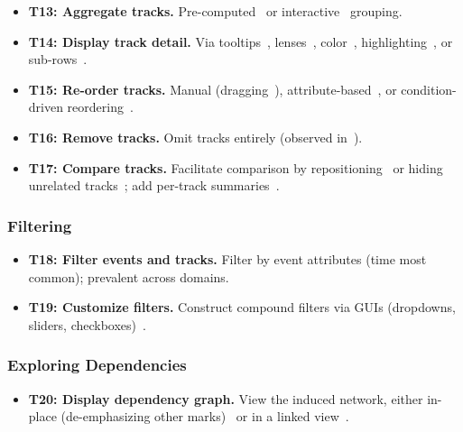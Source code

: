\begin{refsection}
\begin{itemize}\itemsep0.25ex
\item \textbf{T13: Aggregate tracks.} Pre-computed~\cite{sakin2022traveler, sun2021daisen, nesi2023summarizing} or interactive~\cite{plaisant1998information, jo2014livegantt, kaldor2017canopy} grouping.

\item \textbf{T14: Display track detail.} Via tooltips~\cite{sun2021daisen}, lenses~\cite{jo2014livegantt}, color~\cite{schnorr2010triva}, highlighting~\cite{drebes2014aftermath, adhianto2010hpctoolkit}, or sub-rows~\cite{plaisant1998information}. 

\item \textbf{T15: Re-order tracks.} Manual (dragging~\cite{de2000paje}), attribute-based~\cite{heath1991visualizing}, or condition-driven reordering~\cite{jo2014livegantt, de2010zinsight}. 

\item \textbf{T16: Remove tracks.} Omit tracks entirely (observed in~\cite{gupta2016movementslicer}). 

\item \textbf{T17: Compare tracks.} Facilitate comparison by repositioning~\cite{sun2021daisen} or hiding unrelated tracks~\cite{koike1997visualinda,tory2013comparative, kaldor2017canopy}; add per-track summaries~\cite{pinto2016analyzing}.
\end{itemize}

\subsubsection{Filtering}

\begin{itemize}\itemsep0.25ex
\item \textbf{T18: Filter events and tracks.} Filter by event attributes (time most common); prevalent across domains.

\item \textbf{T19: Customize filters.} Construct compound filters via GUIs (dropdowns, sliders, checkboxes)~\cite{fails2006visual, jo2014livegantt, drebes2014aftermath, pillet1995paraver, kaldor2017canopy}. 
\end{itemize}

\subsubsection{Exploring Dependencies}

\begin{itemize}\itemsep0.25ex
\item \textbf{T20: Display dependency graph.} View the induced network, either in-place (de-emphasizing other marks)~\cite{schnorr2010triva} or in a linked view~\cite{adhianto2010hpctoolkit, de2010zinsight, sakin2022traveler}. 


\end{itemize}
\end{refsection}
